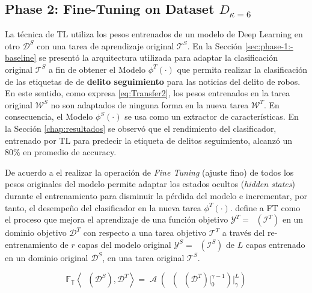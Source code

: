 \documentclass[onecolumn, journal, english, 12pt, a4paper]{IEEEtran} %
\DeclareMathOperator{\ypredtarget}{\phi^{T}}
\DeclareMathOperator{\ypredsource}{\phi^{S}}
\DeclareMathOperator{\ConvNetOut}{\mathcal{A}}
\theoremstyle{definition}
\begin{document}
\subsection{Phase 2: Fine-Tuning on Dataset $D_{\kappa=6}$}
\label{sec:phase-2:-finetuningBert}
La técnica de TL utiliza los pesos entrenados de un modelo de Deep
Learning en otro $\mathcal{D}^{S}$ con una tarea de aprendizaje
original $\mathcal{T}^{S}$. En la Sección \ref{sec:phase-1:-baseline} se
presentó la arquitectura utilizada para adaptar la clasificación
original $\mathcal{T}^{S}$ a fin de obtener el Modelo $\phi^T(\cdot)$
que permita realizar la clasificación de las etiquetas de de
\textbf{delito seguimiento} para las noticias del delito de robos. En
este sentido, como expresa \eqref{eq:Transfer2}, los pesos entrenados
en la tarea original $\mathcal{W}^S$ no son adaptados de ninguna forma
en la nueva tarea $\mathcal{W}^T$. En consecuencia, el Modelo
$\phi^S(\cdot)$ se usa como un extractor de características. En la
Sección \ref{chap:resultados} se observó que el rendimiento del
clasificador, entrenado por TL para predecir la etiqueta de delitos
seguimiento, alcanzó un 80\% en promedio de accuracy.

De acuerdo a \textcite{tunstall2022natural} el realizar la operación
de \emph{Fine Tuning} (ajuste fino) de todos los pesos originales del
modelo permite adaptar los estados ocultos (\emph{hidden states})
durante el entrenamiento para disminuir la pérdida del modelo e
incrementar, por tanto, el desempeño del clasificador en la nueva
tarea $\phi^T(\cdot)$. \textcite{falconi2020transfer} define a FT como
el proceso que mejora el aprendizaje de una función objetivo
$\mathcal{Y}^T = \ypredtarget(\mathcal{I}^T)$ en un dominio objetivo
$\mathcal{D}^T$ con respecto a una tarea objetivo $\mathcal{T}^T$ a
través del re-entrenamiento de $r$ capas del modelo original
$\mathcal{Y}^S = \ypredsource(\mathcal{I}^S)$ de $L$ capas entrenado
en un dominio original $\mathcal{D}^S$, en una tarea original
$\mathcal{T}^S$.

\begin{equation}
    \mathbb{F_{T}} \left< \ypredsource(\mathcal{D}^{S}), \mathcal{D}^{T} \right> = \ConvNetOut \left( \ypredsource \left (\ypredsource(\mathcal{D}^{T}) \Bigr\rvert_{0}^{\gamma -1} \right)\Bigr\rvert_{\gamma}^{L}\right) 
    \label{eq:finetuningLenin}
\end{equation}
\end{document}
